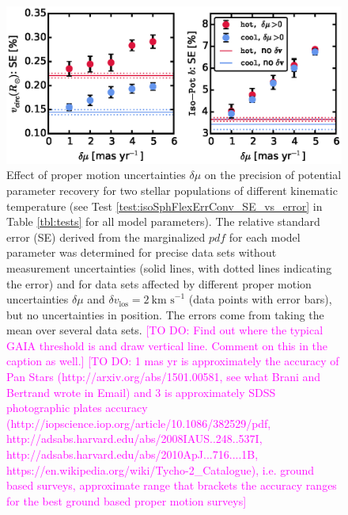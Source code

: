 \documentclass[iop,revtex4]{emulateapj}
\newcommand{\pdf}{\ensuremath{pdf}}
\newcommand{\Wilma}[1]{\textcolor{Magenta}{#1}}
\begin{document}
\begin{figure}[!htbp]
\centering
\includegraphics[width=\columnwidth]{figs/isoSphFlexErrConv_SE_vs_error.eps}
\caption{Effect of proper motion uncertainties $\delta \mu$ on the precision of potential parameter recovery for two stellar populations of different kinematic temperature (see Test \ref{test:isoSphFlexErrConv_SE_vs_error} in Table \ref{tbl:tests} for all model parameters). The relative standard error (SE) derived from the marginalized \pdf{} for each model parameter was determined for precise data sets without measurement uncertainties (solid lines, with dotted lines indicating the error) and for data sets affected by different proper motion uncertainties $\delta \mu$ and $\delta v_\text{los}=2~\text{km s}^{-1}$ (data points with error bars), but no uncertainties in position. The errors come from taking the mean over several data sets. \Wilma{[TO DO: Find out where the typical GAIA threshold is and draw vertical line. Comment on this in the caption as well.]} \Wilma{[TO DO: 1 mas yr is approximately the accuracy of Pan Stars (http://arxiv.org/abs/1501.00581, see what Brani and Bertrand wrote in Email) and 3 is approximately SDSS photographic plates accuracy (http://iopscience.iop.org/article/10.1086/382529/pdf, http://adsabs.harvard.edu/abs/2008IAUS..248..537I, http://adsabs.harvard.edu/abs/2010ApJ...716....1B, https://en.wikipedia.org/wiki/Tycho-2\_Catalogue), i.e. ground based surveys, approximate range that brackets the accuracy ranges for the best ground based proper motion surveys]}}
\label{fig:isoSphFlexErrConv_SE_vs_error}
\end{figure}
\end{document}
